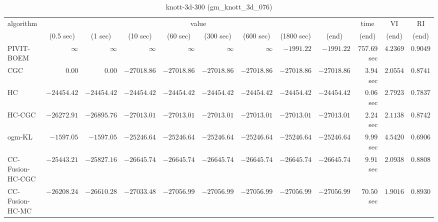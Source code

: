 \begin{table}[H]
\scriptsize
\centering
\caption{knott-3d-300 (gm\_knott\_3d\_076)}
\label{tab:anytimetable-knott-3d-300-gm-knott-3d-076}
\begin{tabular}{lrrrrrrrrrrr}
\toprule
           algorithm &                                   \multicolumn{8}{c}{value} & \multicolumn{1}{c}{time}    & \multicolumn{1}{c}{VI}  & \multicolumn{1}{c}{RI} \\  
\cmidrule(lr){2-9}\cmidrule(lr){10-10} \cmidrule(lr){11-11} \cmidrule(lr){12-12}   
                     & \multicolumn{1}{c}{(0.5 sec)} & \multicolumn{1}{c}{(1 sec)} & \multicolumn{1}{c}{(10 sec)} & \multicolumn{1}{c}{(60 sec)} & \multicolumn{1}{c}{(300 sec)} & \multicolumn{1}{c}{(600 sec)} & \multicolumn{1}{c}{(1800 sec)} & \multicolumn{1}{c}{(end)} & \multicolumn{1}{c}{(end)}    & \multicolumn{1}{c}{(end)}   & \multicolumn{1}{c}{(end)}  \\ \midrule 
          PIVIT-BOEM & $\infty$ & $\infty$ & $\infty$ & $\infty$ & $\infty$ & $\infty$ & $     -1991.22$ & $     -1991.22$ & $       757.69$ sec    & $       4.2369$  & $       0.9049$ \\ 
                 CGC & $         0.00$ & $         0.00$ & $    -27018.86$ & $    -27018.86$ & $    -27018.86$ & $    -27018.86$ & $    -27018.86$ & $    -27018.86$ & $         3.94$ sec    & $       2.0554$  & $       0.8741$ \\ 
                  HC & $    -24454.42$ & $    -24454.42$ & $    -24454.42$ & $    -24454.42$ & $    -24454.42$ & $    -24454.42$ & $    -24454.42$ & $    -24454.42$ & $         0.06$ sec    & $       2.7923$  & $       0.7837$ \\ 
              HC-CGC & $    -26272.91$ & $    -26895.76$ & $    -27013.01$ & $    -27013.01$ & $    -27013.01$ & $    -27013.01$ & $    -27013.01$ & $    -27013.01$ & $         2.24$ sec    & $       2.1138$  & $       0.8742$ \\ 
              ogm-KL & $     -1597.05$ & $     -1597.05$ & $    -25246.64$ & $    -25246.64$ & $    -25246.64$ & $    -25246.64$ & $    -25246.64$ & $    -25246.64$ & $         9.99$ sec    & $       4.5420$  & $       0.6906$ \\ 
    CC-Fusion-HC-CGC & $    -25443.21$ & $    -25827.16$ & $    -26645.74$ & $    -26645.74$ & $    -26645.74$ & $    -26645.74$ & $    -26645.74$ & $    -26645.74$ & $         9.91$ sec    & $       2.0938$  & $       0.8808$ \\ 
     CC-Fusion-HC-MC & $    -26208.24$ & $    -26610.28$ & $    -27033.48$ & $    -27056.99$ & $    -27056.99$ & $    -27056.99$ & $    -27056.99$ & $    -27056.99$ & $        70.50$ sec    & $       1.9016$  & $       0.8930$ \\ 

\end{tabular}
\end{table}
